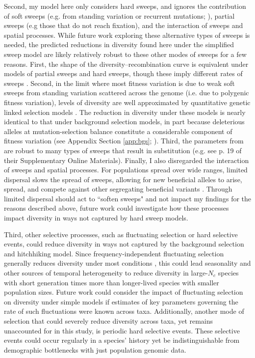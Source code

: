 \documentclass[11pt]{article}
\begin{document}
Second, my model here only considers hard sweeps, and ignores the contribution
of soft sweeps (e.g. from standing variation or recurrent mutations;
\cite{Hermisson2005-hs,Pennings2006-lj}), partial sweeps (e.g those that do not
reach fixation), and the interaction of sweeps and spatial processes. While
future work exploring these alternative types of sweeps is needed, the
predicted reductions in diversity found here under the simplified sweep model
are likely relatively robust to these other modes of sweeps for a few reasons.
First, the shape of the diversity--recombination curve is equivalent under
models of partial sweeps and hard sweeps, though these imply different rates of
sweeps \parencite{Coop2012-cd}. Second, in the limit where most fitness
variation is due to weak soft sweeps from standing variation scattered across
the genome (i.e. due to polygenic fitness variation), levels of diversity are
well approximated by quantitative genetic linked selection models
\parencite{Robertson1961-ho,Santiago1995-hx,Santiago1998-bs}. The reduction in
diversity under these models is nearly identical to that under background
selection models, in part because deleterious alleles at mutation-selection
balance constitute a considerable component of fitness variation (see Appendix
Section \ref{app:bgs}; \cite{Charlesworth2000-km,Charlesworth2015-am}). Third,
the parameters from \textcite{Elyashiv2016-vt} are robust to many types of
sweeps that result in substitution (e.g. see p. 19 of their Supplementary
Online Materials). Finally, I also disregarded the interaction of sweeps and
spatial processes.  For populations spread over wide ranges, limited dispersal
slows the spread of sweeps, allowing for new beneficial alleles to arise,
spread, and compete against other segregating beneficial variants
\parencite{Ralph2015-kl,Ralph2010-ki}. Through limited dispersal should act to
``soften sweeps" and not impact my findings for the reasons described above,
future work could investigate how these processes impact diversity in ways not
captured by hard sweep models.

Third, other selective processes, such as fluctuating selection or hard
selective events, could reduce diversity in ways not captured by the background
selection and hitchhiking model. Since frequency-independent fluctuating
selection generally reduces diversity under most conditions
\parencite{Novak2017-yp}, this could lead seasonality and other sources of
temporal heterogeneity to reduce diversity in large-$N_c$ species with short
generation times more than longer-lived species with smaller population sizes.
Future work could consider the impact of fluctuating selection on diversity
under simple models \parencite{Barton2000-zg} if estimates of key parameters
governing the rate of such fluctuations were known across taxa. Additionally,
another mode of selection that could severely reduce diversity across taxa, yet
remains unaccounted for in this study, is periodic hard selective events. These
selective events could occur regularly in a species' history yet be
indistinguishable from demographic bottlenecks with just population genomic
data. 
\end{document}
